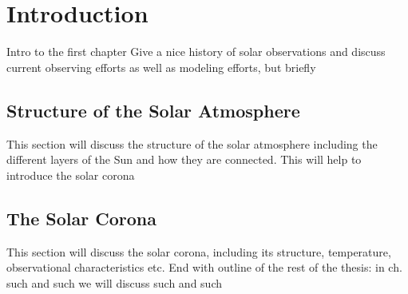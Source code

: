 \chapter{Introduction}
\label{ch:intro}
Intro to the first chapter
Give a nice history of solar observations and discuss current observing efforts as well as modeling efforts, but briefly
\section{Structure of the Solar Atmosphere}
\label{sec:structure}
This section will discuss the structure of the solar atmosphere including the different layers of the Sun and how they are connected. This will help to introduce the solar corona
\section{The Solar Corona}
\label{sec:corona}
This section will discuss the solar corona, including its structure, temperature, observational characteristics etc.
%
End with outline of the rest of the thesis: in ch. such and such we will discuss such and such
